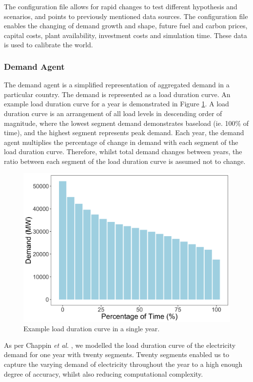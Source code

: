 The configuration file allows for rapid changes to test different hypothesis and scenarios, and points to previously mentioned data sources. The configuration file enables the changing of demand growth and shape,  future fuel and carbon prices, capital costs, plant availability, investment costs and simulation time. These data is used to calibrate the world.

\subsubsection{Demand Agent}
The demand agent is a simplified representation of aggregated demand in a particular country. The demand is represented as a load duration curve. {\color{red}An example load duration curve for a year is demonstrated in Figure \ref{fig:loaddurationcurve}}. A load duration curve is an arrangement of all load levels in descending order of magnitude, where the lowest segment demand demonstrates baseload (ie. 100\% of time), and the highest segment represents peak demand. Each year, the demand agent multiplies the percentage of change in demand with each segment of the load duration curve. Therefore, whilst total demand changes between years, the ratio between each segment of the load duration curve is assumed not to change.

\begin{figure}
	\centering
	\includegraphics[width=0.95\linewidth]{figures/load_duration_curve}
	\caption{{\color{red}Example load duration curve in a single year.}}
 	\label{fig:loaddurationcurve}
\end{figure}

As per Chappin \textit{et al.} \cite{Chappin2017}, we modelled the load duration curve of the electricity demand for one year with twenty segments. Twenty segments enabled us to capture the varying demand of electricity throughout the year to a high enough degree of accuracy, whilst also reducing computational complexity. 


